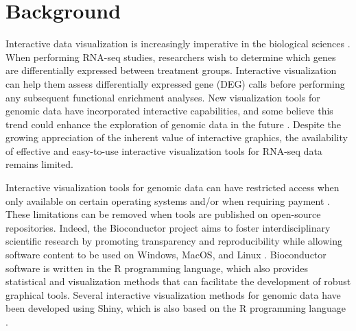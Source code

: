 \documentclass[parskip=full]{bmcart}
\begin{document}




\section*{Background}

Interactive data visualization is increasingly imperative in the biological sciences \cite{o2010visualizing}. When performing RNA-seq studies, researchers wish to determine which genes are differentially expressed between treatment groups. Interactive visualization can help them assess differentially expressed gene (DEG) calls before performing any subsequent functional enrichment analyses. New visualization tools for genomic data have incorporated interactive capabilities, and some believe this trend could enhance the exploration of genomic data in the future \cite{pavlopoulos2015visualizing}. Despite the growing appreciation of the inherent value of interactive graphics, the availability of effective and easy-to-use interactive visualization tools for RNA-seq data remains limited.

Interactive visualization tools for genomic data can have restricted access when only available on certain operating systems and/or when requiring payment \cite{seo2002interactively, ahlberg1996spotfire, chu2001genespringtm}. These limitations can be removed when tools are published on open-source repositories. Indeed, the Bioconductor project aims to foster interdisciplinary scientific research by promoting transparency and reproducibility while allowing software content to be used on Windows, MacOS, and Linux \cite{gentleman2004bioconductor}. Bioconductor software is written in the R programming language, which also provides statistical and visualization methods that can facilitate the development of robust graphical tools. Several interactive visualization methods for genomic data have been developed using Shiny, which is also based on the R programming language \cite{rue2018isee, schultheis2018wilson, hughes2017expressiondb}. 
\end{document}
